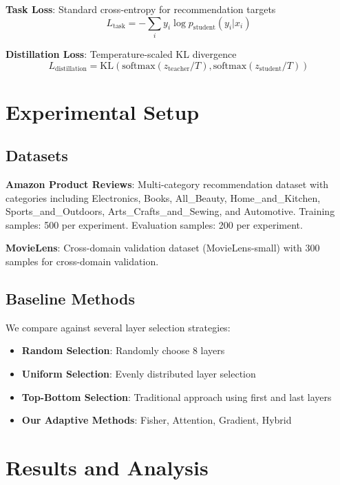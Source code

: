\documentclass[sigconf]{acmart}
\begin{document}
\textbf{Task Loss}: Standard cross-entropy for recommendation targets
\begin{equation}
L_{\text{task}} = -\sum_i y_i \log p_{\text{student}}(y_i|x_i)
\end{equation}

\textbf{Distillation Loss}: Temperature-scaled KL divergence
\begin{equation}
L_{\text{distillation}} = \text{KL}(\text{softmax}(z_{\text{teacher}}/T), \text{softmax}(z_{\text{student}}/T))
\end{equation}

\section{Experimental Setup}

\subsection{Datasets}

\textbf{Amazon Product Reviews}: Multi-category recommendation dataset with categories including Electronics, Books, All\_Beauty, Home\_and\_Kitchen, Sports\_and\_Outdoors, Arts\_Crafts\_and\_Sewing, and Automotive. Training samples: 500 per experiment. Evaluation samples: 200 per experiment.

\textbf{MovieLens}: Cross-domain validation dataset (MovieLens-small) with 300 samples for cross-domain validation.

\subsection{Baseline Methods}

We compare against several layer selection strategies:
\begin{itemize}
\item \textbf{Random Selection}: Randomly choose 8 layers
\item \textbf{Uniform Selection}: Evenly distributed layer selection
\item \textbf{Top-Bottom Selection}: Traditional approach using first and last layers
\item \textbf{Our Adaptive Methods}: Fisher, Attention, Gradient, Hybrid
\end{itemize}

\section{Results and Analysis}
\end{document}
